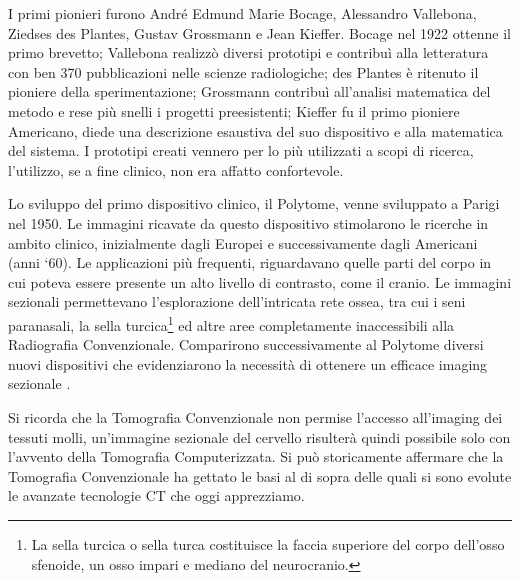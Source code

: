 \documentclass[a4paper,12pt, doubleside]{report}
\begin{document}
                \bigskip
                \par
                    I primi pionieri furono André Edmund Marie Bocage, Alessandro Vallebona, Ziedses des Plantes, Gustav Grossmann e Jean Kieffer. Bocage nel 1922 ottenne il primo brevetto; Vallebona realizzò diversi prototipi e contribuì alla letteratura con ben 370 pubblicazioni nelle scienze radiologiche\cite{vallebona-ricordo}; des Plantes è ritenuto il pioniere della sperimentazione; Grossmann contribuì all’analisi matematica del metodo e rese più snelli i progetti preesistenti; Kieffer fu il primo pioniere Americano, diede una descrizione esaustiva del suo dispositivo e alla matematica del sistema. I prototipi creati vennero per lo più utilizzati a scopi di ricerca, l'utilizzo, se a fine clinico, non era affatto confortevole.
                
                \bigskip
                \par
                    Lo sviluppo del primo dispositivo clinico, il Polytome, venne sviluppato a Parigi nel 1950. Le immagini ricavate da questo dispositivo stimolarono le ricerche in ambito clinico, inizialmente dagli Europei e successivamente dagli Americani (anni ‘60).
                    Le applicazioni più frequenti, riguardavano quelle parti del corpo in cui poteva essere presente un alto livello di contrasto, come il cranio. Le immagini sezionali permettevano l’esplorazione dell’intricata rete ossea, tra cui i seni paranasali, la sella turcica\footnote{La sella turcica o sella turca costituisce la faccia superiore del corpo dell'osso sfenoide, un osso impari e mediano del neurocranio.} ed altre aree completamente inaccessibili alla Radiografia Convenzionale. Comparirono successivamente al Polytome diversi nuovi dispositivi che evidenziarono la necessità di ottenere un efficace imaging sezionale \cite{conventional-tomography}.
                
                \bigskip
                \par
                    Si ricorda che la Tomografia Convenzionale non permise l’accesso all’imaging dei tessuti molli, un’immagine sezionale del cervello risulterà quindi possibile solo con l’avvento della Tomografia Computerizzata. Si può storicamente affermare che la Tomografia Convenzionale ha gettato le basi al di sopra delle quali si sono evolute le avanzate tecnologie CT che oggi apprezziamo.
                        
\end{document}
